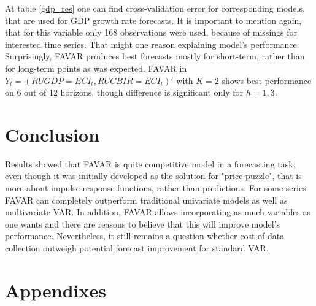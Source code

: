 \documentclass[a4paper, 14pt]{article}
\begin{document}
At table \ref{gdp_res} one can find cross-validation error for corresponding models, that are used for GDP growth rate forecasts. It is important to mention again, that for this variable only 168 observations were used, because of missings for interested time series. That might one reason explaining model's performance. Surprisingly, FAVAR produces best forecasts mostly for short-term, rather than for long-term points as was expected. FAVAR in $Y_t=(RUGDP=ECI_t, RUCBIR=ECI_t)'$ with $K=2$ shows best performance on 6 out of 12 horizons, though difference is significant only for $h=\overline{1,3}$.

\section{Conclusion}
Results showed that FAVAR is quite competitive model in a forecasting task, even though it was initially developed as the solution for "price puzzle", that is more about impulse response functions, rather than predictions. For some series FAVAR can completely outperform traditional univariate models as well as multivariate VAR. In addition, FAVAR allows incorporating as much variables as one wants and there are reasons to believe that this will improve model's performance. Nevertheless, it still remains a question whether cost of data collection outweigh potential forecast improvement for standard VAR. 



\newpage
\section*{Appendixes}
\appendix
\end{document}
